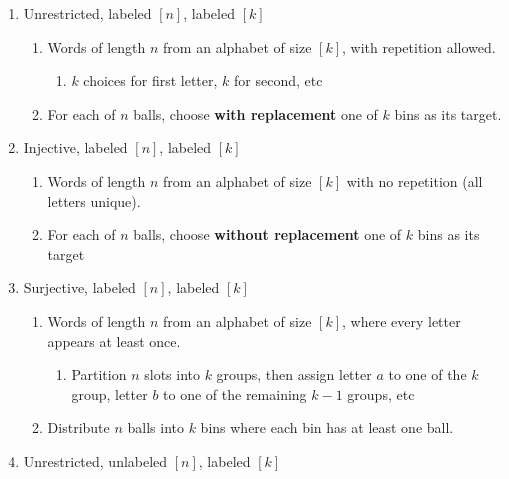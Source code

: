 \begin{enumerate}
\def\labelenumi{\arabic{enumi}.}
\tightlist
\item
  Unrestricted, labeled \([n]\), labeled \([k]\)

  \begin{enumerate}
  \def\labelenumii{\arabic{enumii}.}
  \tightlist
  \item
    Words of length \(n\) from an alphabet of size \([k]\), with
    repetition allowed.

    \begin{enumerate}
    \def\labelenumiii{\arabic{enumiii}.}
    \tightlist
    \item
      \(k\) choices for first letter, \(k\) for second, etc
    \end{enumerate}
  \item
    For each of \(n\) balls, choose \textbf{with replacement} one of
    \(k\) bins as its target.
  \end{enumerate}
\item
  Injective, labeled \([n]\), labeled \([k]\)

  \begin{enumerate}
  \def\labelenumii{\arabic{enumii}.}
  \tightlist
  \item
    Words of length \(n\) from an alphabet of size \([k]\) with no
    repetition (all letters unique).
  \item
    For each of \(n\) balls, choose \textbf{without replacement} one of
    \(k\) bins as its target
  \end{enumerate}
\item
  Surjective, labeled \([n]\), labeled \([k]\)

  \begin{enumerate}
  \def\labelenumii{\arabic{enumii}.}
  \tightlist
  \item
    Words of length \(n\) from an alphabet of size \([k]\), where every
    letter appears at least once.

    \begin{enumerate}
    \def\labelenumiii{\arabic{enumiii}.}
    \tightlist
    \item
      Partition \(n\) slots into \(k\) groups, then assign letter \(a\)
      to one of the \(k\) group, letter \(b\) to one of the remaining
      \(k-1\) groups, etc
    \end{enumerate}
  \item
    Distribute \(n\) balls into \(k\) bins where each bin has at least
    one ball.
  \end{enumerate}
\item
  Unrestricted, unlabeled \([n]\), labeled \([k]\)


\end{enumerate}
